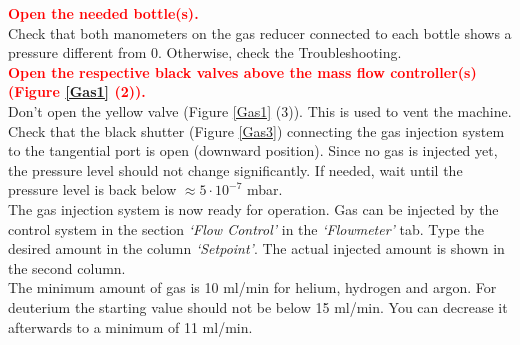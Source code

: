 \documentclass[fleqn,a4paper,20pt]{article}
\begin{document}
\begin{minipage}{.68\textwidth}

		
\textcolor{red}{\textbf{Open the needed bottle(s).}}\\

Check that both manometers on the gas reducer connected to each bottle shows a pressure different from 0. Otherwise, check the Troubleshooting.\\

\textcolor{red}{\textbf{Open the respective black valves above the mass flow controller(s) (Figure \ref{Gas1} (2)).}}\\


Don’t open the yellow valve (Figure \ref{Gas1} (3)). This is used to vent the machine. Check that the black shutter (Figure \ref{Gas3}) connecting the gas injection system to the tangential port is open (downward position). Since no gas is injected yet, the pressure level should not change significantly. If needed, wait until the pressure level is back below  $\approx 5\cdot 10^{-7}$ mbar.\\

The gas injection system is now ready for operation. Gas can be injected by the control system in the section \textit{`Flow Control'} in the \textit{`Flowmeter'} tab. Type the desired amount in the column \textit{`Setpoint'}. The actual injected amount is shown in the second column.\\

The minimum amount of gas is 10 ml/min for helium, hydrogen and argon. For deuterium the starting value should not be below 15 ml/min. You can decrease it afterwards to a minimum of 11 ml/min. 
\end{minipage}
\begin{minipage}{.02\textwidth}
$\ $\\
\end{minipage}
\end{document}
